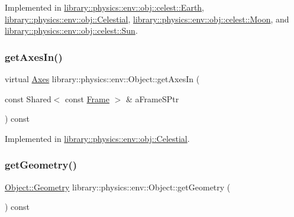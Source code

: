 Implemented in \hyperlink{classlibrary_1_1physics_1_1env_1_1obj_1_1celest_1_1_earth_aca39bec00a2046a3fcef9bf22be52428}{library\+::physics\+::env\+::obj\+::celest\+::\+Earth}, \hyperlink{classlibrary_1_1physics_1_1env_1_1obj_1_1_celestial_aaf8aa41a0ff9336eba62c07e3c27f82d}{library\+::physics\+::env\+::obj\+::\+Celestial}, \hyperlink{classlibrary_1_1physics_1_1env_1_1obj_1_1celest_1_1_moon_a9d922ab338809a6c1052edbe11ce3e60}{library\+::physics\+::env\+::obj\+::celest\+::\+Moon}, and \hyperlink{classlibrary_1_1physics_1_1env_1_1obj_1_1celest_1_1_sun_a79fa2d336dad399c3d933b0f5a2f9427}{library\+::physics\+::env\+::obj\+::celest\+::\+Sun}.

\mbox{\label{classlibrary_1_1physics_1_1env_1_1_object_a6807199a92fd78c10c6327b9ca654f50}} 
\subsubsection{\texorpdfstring{get\+Axes\+In()}{getAxesIn()}}
{\footnotesize\ttfamily virtual \hyperlink{classlibrary_1_1physics_1_1coord_1_1_axes}{Axes} library\+::physics\+::env\+::\+Object\+::get\+Axes\+In (\begin{DoxyParamCaption}\item[{const Shared$<$ const \hyperlink{classlibrary_1_1physics_1_1coord_1_1_frame}{Frame} $>$ \&}]{a\+Frame\+S\+Ptr }\end{DoxyParamCaption}) const\hspace{0.3cm}{\ttfamily [pure virtual]}}



Implemented in \hyperlink{classlibrary_1_1physics_1_1env_1_1obj_1_1_celestial_a51d7ed3c0dcf627fbbcd81f9b190fb6b}{library\+::physics\+::env\+::obj\+::\+Celestial}.

\mbox{\label{classlibrary_1_1physics_1_1env_1_1_object_a504f76c6e6da18b531972e6f26329255}} 
\subsubsection{\texorpdfstring{get\+Geometry()}{getGeometry()}}
{\footnotesize\ttfamily \hyperlink{classlibrary_1_1physics_1_1env_1_1_object_abdf50733c7ad97327fb64edca5670f13}{Object\+::\+Geometry} library\+::physics\+::env\+::\+Object\+::get\+Geometry (\begin{DoxyParamCaption}{ }\end{DoxyParamCaption}) const}

